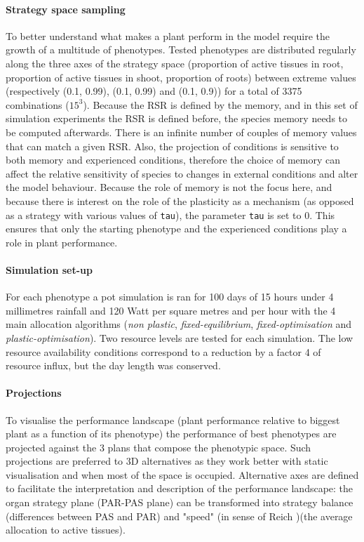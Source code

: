 \paragraph{Strategy space sampling}
To better understand what makes a plant perform in the model require the growth of a multitude of phenotypes. Tested phenotypes are distributed regularly along the three axes of the strategy space (proportion of active tissues in root, proportion of active tissues in shoot, proportion of roots) between extreme values (respectively (0.1, 0.99), (0.1, 0.99) and (0.1, 0.9)) for a total of 3375 combinations ($15^{3}$).  Because the RSR is defined by the memory, and in this set of simulation experiments the RSR is defined before, the species memory needs to be computed afterwards. There is an infinite number of couples of memory values that can match a given RSR. Also, the projection of conditions is sensitive to both memory and experienced conditions, therefore the choice of memory can affect the relative sensitivity of species to changes in external conditions and alter the model behaviour. Because the role of memory is not the focus here, and because there is interest on the role of the plasticity as a mechanism (as opposed as a strategy with various values of \texttt{tau}), the parameter \texttt{tau} is set to 0. This ensures that only the starting phenotype and the experienced conditions play a role in plant performance.

\paragraph{Simulation set-up}

For each phenotype a pot simulation is ran for 100 days of 15 hours under 4 millimetres rainfall and 120 Watt per square metres and per hour with the 4 main allocation algorithms (\textit{non plastic}, \textit{fixed-equilibrium}, \textit{fixed-optimisation} and \textit{plastic-optimisation}). Two resource levels are tested for each simulation. The low resource availability conditions correspond to a reduction by a factor 4 of resource influx, but the day length was conserved.

\paragraph{Projections}

To visualise the performance landscape (plant performance relative to biggest plant as a function of its phenotype) the performance of best phenotypes are projected against the 3 plans that compose the phenotypic space. Such projections are preferred to 3D alternatives as they work better with static visualisation and when most of the space is occupied. Alternative axes are defined to facilitate the interpretation and description of the performance landscape: the organ strategy plane (PAR-PAS plane) can be transformed into strategy balance (differences between PAS and PAR) and "speed" (in sense of Reich \parencite{reich_world-wide_2014})(the average allocation to active tissues).

